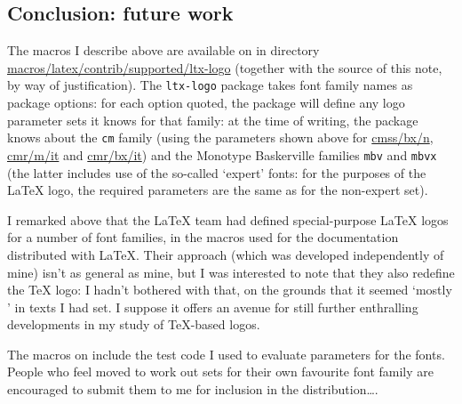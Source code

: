 \begin{Article}
  \section{Conclusion: future work}

  The macros I describe above are available on  in
  directory \url{macros/latex/contrib/supported/ltx-logo} (together
  with the source of this note, by way of justification).  The
  \texttt{ltx-logo} package takes font family names as package
  options: for each option quoted, the package will define any logo
  parameter sets it knows for that family: at the time of writing, the
  package knows about the \texttt{cm} family (using the parameters
  shown above for \url{cmss/bx/n}, \url{cmr/m/it} and \url{cmr/bx/it})
  and the Monotype Baskerville families \texttt{mbv} and \texttt{mbvx}
  (the latter includes use of the so-called `expert' fonts: for the
  purposes of the \LaTeX{} logo, the required parameters are the same
  as for the non-expert set).

  I remarked above that the \LaTeX{} team had defined special-purpose
  \LaTeX{} logos for a number of font families, in the macros used for
  the documentation distributed with \LaTeX.  Their approach (which
  was developed independently of mine) isn't as general as mine, but I
  was interested to note that they also redefine the \TeX{} logo: I
  hadn't bothered with that, on the grounds that it seemed `mostly
  ' in texts I had set.  I suppose it offers an avenue for
  still further enthralling developments in my study of \TeX-based
  logos.

  The macros on  include the test code I used to evaluate
  parameters for the fonts.  People who feel moved to work out sets
  for their own favourite font family are encouraged to submit them to
  me for inclusion in the distribution\dots.
\end{Article}
